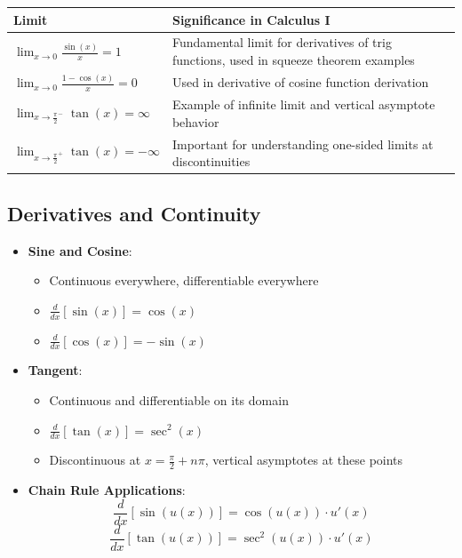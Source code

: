 \documentclass[../main-notes.tex]{subfile}
\begin{document}
\begin{table}[h]
\centering
\renewcommand{\arraystretch}{1.5}
\begin{tabular}{@{}lp{10cm}@{}}
\toprule
\textbf{Limit} & \textbf{Significance in Calculus I} \\ 
\midrule
\( \displaystyle \lim_{x \to 0} \frac{\sin(x)}{x} = 1 \) & 
Fundamental limit for derivatives of trig functions, used in squeeze theorem examples \\
\addlinespace
\( \displaystyle \lim_{x \to 0} \frac{1 - \cos(x)}{x} = 0 \) &
Used in derivative of cosine function derivation \\
\addlinespace
\( \displaystyle \lim_{x \to \frac{\pi}{2}^-} \tan(x) = \infty \) &
Example of infinite limit and vertical asymptote behavior \\
\addlinespace
\( \displaystyle \lim_{x \to \frac{\pi}{2}^+} \tan(x) = -\infty \) &
Important for understanding one-sided limits at discontinuities \\
\bottomrule
\end{tabular}
\end{table}

\subsection*{Derivatives and Continuity}

\begin{itemize}
    \item \textbf{Sine and Cosine}:
    \begin{itemize}
        \item Continuous everywhere, differentiable everywhere
        \item \( \frac{d}{dx}[\sin(x)] = \cos(x) \)
        \item \( \frac{d}{dx}[\cos(x)] = -\sin(x) \)
    \end{itemize}
    
    \item \textbf{Tangent}:
    \begin{itemize}
        \item Continuous and differentiable on its domain
        \item \( \frac{d}{dx}[\tan(x)] = \sec^2(x) \)
        \item Discontinuous at \( x = \frac{\pi}{2} + n\pi \), vertical asymptotes at these points
    \end{itemize}
    
    \item \textbf{Chain Rule Applications}:
    \[
    \frac{d}{dx}[\sin(u(x))] = \cos(u(x)) \cdot u'(x)
    \]
    \[
    \frac{d}{dx}[\tan(u(x))] = \sec^2(u(x)) \cdot u'(x)
    \]
\end{itemize}
\end{document}
